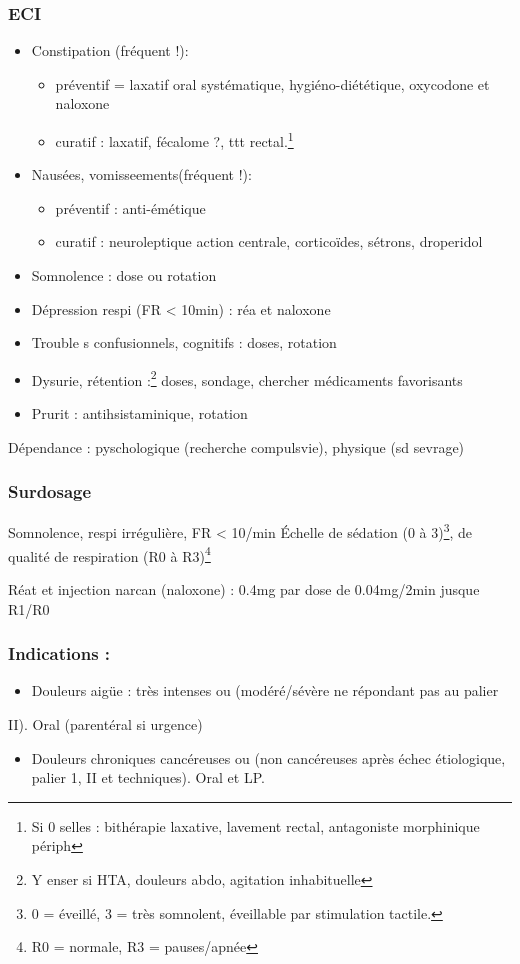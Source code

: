 \documentclass[11pt]{article}
\begin{document}
\subsubsection{ECI}
\label{sec:org4eead4b}
\begin{itemize}
\item Constipation (fréquent !):
\begin{itemize}
\item préventif = laxatif oral systématique, hygiéno-diététique, oxycodone et
naloxone
\item curatif : \inc laxatif, fécalome ?, ttt rectal.\footnote{Si 0 selles : bithérapie laxative, lavement rectal, antagoniste
morphinique périph}
\end{itemize}
\item Nausées, vomisseements(fréquent !):
\begin{itemize}
\item préventif : anti-émétique
\item curatif : neuroleptique action centrale, corticoïdes, sétrons, droperidol
\end{itemize}
\item Somnolence : \dec dose ou rotation
\item Dépression respi (FR < 10min) : réa et naloxone
\item Trouble s confusionnels, cognitifs : \dec doses, rotation
\item Dysurie, rétention :\footnote{Y enser si HTA, douleurs abdo, agitation inhabituelle} \dec doses, sondage, chercher médicaments favorisants
\item Prurit : antihsistaminique, rotation
\end{itemize}

Dépendance : pyschologique (recherche compulsvie), physique (sd sevrage)

\subsubsection{Surdosage}
\label{sec:orga2999ab}
Somnolence, respi irrégulière, FR < 10/min
Échelle de sédation (0 à 3)\footnote{0 = éveillé, 3 = très somnolent, éveillable par stimulation tactile.}, de qualité de respiration (R0 à R3)\footnote{R0 = normale, R3 = pauses/apnée}

Réat et injection narcan (naloxone) : 0.4mg par dose de 0.04mg/2min jusque R1/R0

\subsubsection{Indications :}
\label{sec:org69e4456}
\begin{itemize}
\item Douleurs aigüe : très intenses ou (modéré/sévère ne répondant pas au palier
\end{itemize}
II). Oral (parentéral si urgence)
\begin{itemize}
\item Douleurs chroniques cancéreuses ou (non cancéreuses après échec étiologique,
palier 1, II et techniques). Oral et LP.
\end{itemize}
\end{document}
